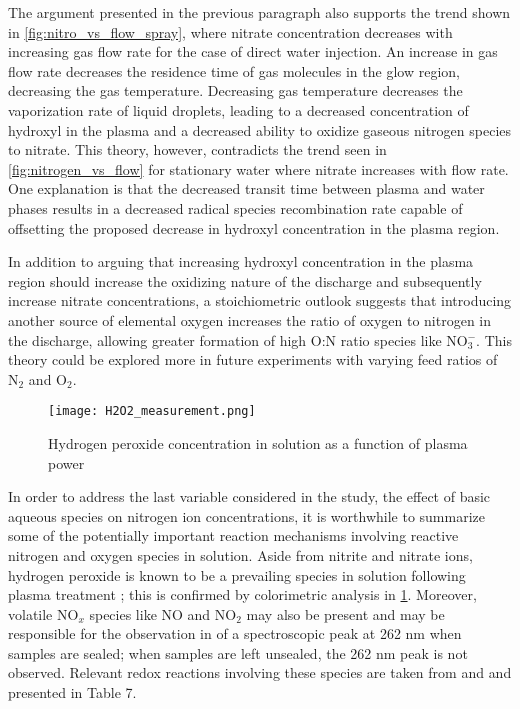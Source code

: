 The argument presented in the previous paragraph also supports the trend shown in \cref{fig:nitro_vs_flow_spray}, where nitrate concentration decreases with increasing gas flow rate for the case of direct water injection.  An increase in gas flow rate decreases the residence time of gas molecules in the glow region, decreasing the gas temperature.  Decreasing gas temperature decreases the vaporization rate of liquid droplets, leading to a decreased concentration of hydroxyl in the plasma and a decreased ability to oxidize gaseous nitrogen species to nitrate.  This theory, however, contradicts the trend seen in \cref{fig:nitrogen_vs_flow} for stationary water where nitrate increases with flow rate.  One explanation is that the decreased transit time between plasma and water phases results in a decreased radical species recombination rate capable of offsetting the proposed decrease in hydroxyl concentration in the plasma region.

In addition to arguing that increasing hydroxyl concentration in the plasma region should increase the oxidizing nature of the discharge and subsequently increase nitrate concentrations, a stoichiometric outlook suggests that introducing another source of elemental oxygen increases the ratio of oxygen to nitrogen in the discharge, allowing greater formation of high O:N ratio species like NO$_3^-$.  This theory could be explored more in future experiments with varying feed ratios of N$_2$ and O$_2$.

\begin{figure}[htbp]
  \centering
  \texttt{[image: H2O2\_measurement.png]}
  \caption{Hydrogen peroxide concentration in solution as a function of plasma power}
  \label{fig:H2O2}
\end{figure}

In order to address the last variable considered in the study, the effect of basic aqueous species on nitrogen ion concentrations, it is worthwhile to summarize some of the potentially important reaction mechanisms involving reactive nitrogen and oxygen species in solution.   Aside from nitrite and nitrate ions, hydrogen peroxide is known to be a prevailing species in solution following plasma treatment \cite{traylor2011long}; this is confirmed by colorimetric analysis in \cref{fig:H2O2}.  Moreover, volatile NO$_x$ species like NO and NO$_2$ may also be present and may be responsible for the observation in \cite{traylor2011long} of a spectroscopic peak at 262 nm when samples are sealed; when samples are left unsealed, the 262 nm peak is not observed.  Relevant redox reactions involving these species are taken from \cite{brisset2012peroxynitrite}  and \cite{greenwood1984chemistry} and presented in Table 7.

